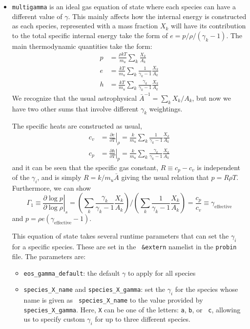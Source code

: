 \begin{itemize}
\item {\tt multigamma} is an ideal gas equation of state where each
  species can have a different value of $\gamma$.  This mainly affects
  how the internal energy is constructed as each species, represented
  with a mass fraction $X_k$ will have its contribution to the total
  specific internal energy take the form of $e = p/\rho/(\gamma_k -
  1)$.  The main thermodynamic quantities take the form:
\begin{align}
p &= \frac{\rho k T}{m_u} \sum_k \frac{X_k}{A_k} \\
e &= \frac{k T}{m_u} \sum_k \frac{1}{\gamma_k - 1} \frac{X_k}{A_k} \\
h &= \frac{k T}{m_u} \sum_k \frac{\gamma_k}{\gamma_k - 1} \frac{X_k}{A_k}
\end{align}
We recognize that the usual astrophysical $\bar{A}^{-1} = \sum_k
X_k/A_k$, but now we have two other sums that involve different
$\gamma_k$ weightings.

The specific heats are constructed as usual,
\begin{align}
c_v &= \left . \frac{\partial e}{\partial T} \right |_\rho = 
    \frac{k}{m_u} \sum_k \frac{1}{\gamma_k - 1} \frac{X_k}{A_k} \\
c_p &= \left . \frac{\partial h}{\partial T} \right |_p = 
    \frac{k}{m_u} \sum_k \frac{\gamma_k}{\gamma_k - 1} \frac{X_k}{A_k} 
\end{align}
and it can be seen that the specific gas constant, $R \equiv c_p -
c_v$ is independent of the $\gamma_i$, and is simply $R =
k/m_u\bar{A}$ giving the usual relation that $p = R\rho T$.
Furthermore, we can show
\begin{equation}
\Gamma_1 \equiv \left . \frac{\partial \log p}{\partial \log \rho} \right |_s =  
   \left ( \sum_k \frac{\gamma_k}{\gamma_k - 1} \frac{X_k}{A_k} \right ) \bigg /
   \left ( \sum_k \frac{1}{\gamma_k - 1} \frac{X_k}{A_k} \right ) =
\frac{c_p}{c_v} \equiv \gamma_\mathrm{effective} 
\end{equation}
and $p = \rho e (\gamma_\mathrm{effective} - 1)$.

This equation of state takes several runtime parameters that can set
the $\gamma_i$ for a specific species.  These are set in the {\tt
  \&extern} namelist in the {\tt probin} file.  The parameters are:
\begin{itemize}
\item {\tt eos\_gamma\_default}: the default $\gamma$ to apply for all
  species
\item {\tt species\_X\_name} and {\tt species\_X\_gamma}: set the
  $\gamma_i$ for the species whose name is given as {\tt
  species\_X\_name} to the value provided by {\tt species\_X\_gamma}.
  Here, {\tt X} can be one of the letters: {\tt a}, {\tt b}, or {\tt
    c}, allowing us to specify custom $\gamma_i$ for up to three
  different species.
\end{itemize}


\end{itemize}

